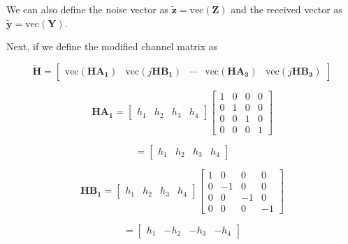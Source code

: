 \documentclass[fleqn]{article}
\begin{document}
\begin{enumerate}
\begin{enumerate}
			We can also define the noise vector as $\mathbf{\tilde{z}} = \text{vec}(\mathbf{Z})$ and the received vector as $\mathbf{\tilde{y}} = \text{vec}(\mathbf{Y})$.
			
			Next, if we define the modified channel matrix as
			
			\begin{equation*}
				\mathbf{\tilde{H}} = \begin{bmatrix}
					\text{vec}(\mathbf{HA_1}) & \text{vec}(j\mathbf{HB_1}) & \cdots & \text{vec}(\mathbf{HA_3}) & \text{vec}(j\mathbf{HB_3})
				\end{bmatrix}
			\end{equation*} 
			
			\begin{equation*}
				\mathbf{HA_1} = \begin{bmatrix}
					h_1 & h_2 & h_3 & h_4
				\end{bmatrix}\begin{bmatrix}
					1 & 0 & 0 & 0 \\
					0 & 1 & 0 & 0 \\
					0 & 0 & 1 & 0 \\
					0 & 0 & 0 & 1
				\end{bmatrix}
			\end{equation*}
			
			\begin{equation*}
				= \begin{bmatrix}
					h_1 & h_2 & h_3 & h_4
				\end{bmatrix}
			\end{equation*}
			
			\begin{equation*}
				\mathbf{HB_1} = \begin{bmatrix}
					h_1 & h_2 & h_3 & h_4
				\end{bmatrix}\begin{bmatrix}
					1 &  0 &  0 &  0 \\
					0 & -1 &  0 &  0 \\
					0 &  0 & -1 &  0 \\
					0 &  0 &  0 & -1
				\end{bmatrix}
			\end{equation*}
			
			\begin{equation*}
				 = \begin{bmatrix}
					h_1 & -h_2 & -h_3 & -h_4
				\end{bmatrix}
			\end{equation*}
			

\end{enumerate}
\end{enumerate}
\end{document}
